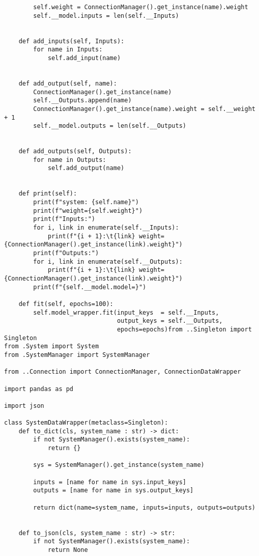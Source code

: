\begin{verbatim}
        self.weight = ConnectionManager().get_instance(name).weight
        self.__model.inputs = len(self.__Inputs)
    
    
    def add_inputs(self, Inputs):
        for name in Inputs:
            self.add_input(name)
    
        
    def add_output(self, name):
        ConnectionManager().get_instance(name)
        self.__Outputs.append(name)
        ConnectionManager().get_instance(name).weight = self.__weight + 1
        self.__model.outputs = len(self.__Outputs)
    
        
    def add_outputs(self, Outputs):
        for name in Outputs:
            self.add_output(name)
    
        
    def print(self):
        print(f"system: {self.name}")
        print(f"weight={self.weight}")
        print(f"Inputs:")
        for i, link in enumerate(self.__Inputs):
            print(f"{i + 1}:\t{link} weight={ConnectionManager().get_instance(link).weight}")
        print(f"Outputs:")
        for i, link in enumerate(self.__Outputs):
            print(f"{i + 1}:\t{link} weight={ConnectionManager().get_instance(link).weight}")
        print(f"{self.__model.model=}")
        
    def fit(self, epochs=100):
        self.model_wrapper.fit(input_keys  = self.__Inputs, 
                               output_keys = self.__Outputs,
                               epochs=epochs)from ..Singleton import Singleton
from .System import System
from .SystemManager import SystemManager

from ..Connection import ConnectionManager, ConnectionDataWrapper

import pandas as pd

import json

class SystemDataWrapper(metaclass=Singleton):
    def to_dict(cls, system_name : str) -> dict:
        if not SystemManager().exists(system_name):
            return {}
        
        sys = SystemManager().get_instance(system_name)
        
        inputs = [name for name in sys.input_keys]        
        outputs = [name for name in sys.output_keys]
        
        return dict(name=system_name, inputs=inputs, outputs=outputs)

    
    def to_json(cls, system_name : str) -> str:
        if not SystemManager().exists(system_name):
            return None
        

\end{verbatim}
